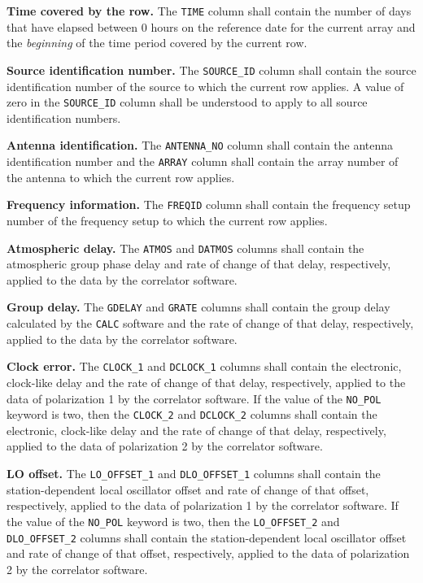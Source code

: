 \documentclass[twoside]{article}
\begin{document}
{\bf Time covered by the row.}  The {\tt TIME} column shall contain
the number of days that have elapsed between 0 hours on the reference
date for the current array and the {\it beginning} of the time period
covered by the current row.

{\bf Source identification number.}  The {\tt SOURCE\_ID} column shall
contain the source identification number of the source to which the
current row applies.  A value of zero in the {\tt SOURCE\_ID} column
shall be understood to apply to all source identification numbers.

{\bf Antenna identification.}  The {\tt ANTENNA\_NO} column shall
contain the antenna identification number and the {\tt ARRAY} column
shall contain the array number of the antenna to which the current row
applies.

{\bf Frequency information.}  The {\tt FREQID} column shall contain
the frequency setup number of the frequency setup to which the current
row applies.

{\bf Atmospheric delay.}  The {\tt ATMOS} and {\tt DATMOS} columns
shall contain the atmospheric group phase delay and rate of change of
that delay, respectively, applied to the data by the correlator
software.

{\bf Group delay.} The {\tt GDELAY} and {\tt GRATE} columns shall
contain the group delay calculated by the {\tt CALC} software and the
rate of change of that delay, respectively, applied to the data by the
correlator software.

{\bf Clock error.}  The {\tt CLOCK\_1} and {\tt DCLOCK\_1} columns
shall contain the electronic, clock-like delay and the rate of change
of that delay, respectively, applied to the data of polarization 1 by
the correlator software.  If the value of the {\tt NO\_POL} keyword is
two, then the {\tt CLOCK\_2} and {\tt DCLOCK\_2} columns shall contain
the electronic, clock-like delay and the rate of change of that delay,
respectively, applied to the data of polarization 2 by the correlator
software.

{\bf LO offset.}  The {\tt LO\_OFFSET\_1} and  {\tt DLO\_OFFSET\_1}
columns shall contain the station-dependent local oscillator offset
and rate of change of that offset, respectively, applied to the data
of polarization 1 by the correlator software.  If the value of the
{\tt NO\_POL} keyword is two, then the {\tt LO\_OFFSET\_2} and  {\tt
  DLO\_OFFSET\_2} columns shall contain the station-dependent local
oscillator offset and rate of change of that offset, respectively,
applied to the data of polarization 2 by the correlator software.
\end{document}
